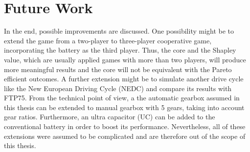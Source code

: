 \section{Future Work}
In the end, possible improvements are discussed. One possibility might be to extend the game from a two-player to three-player cooperative game, incorporating the battery as the third player. Thus, the core and the Shapley value, which are usually applied games with more than two players, will produce more meaningful results and the core will not be equivalent with the Pareto efficient outcomes. A further extension might be to simulate another drive cycle like the New European Driving Cycle (NEDC) and compare its results with FTP75. From the technical point of view, a the automatic gearbox  assumed in this thesis can be extended to manual gearbox with 5 gears, taking into account gear ratios. Furthermore, an ultra capacitor (UC) can be added to the conventional battery in order to boost its performance. Nevertheless, all of these extensions were assumed to be complicated and are therefore out of the scope of this thesis.
